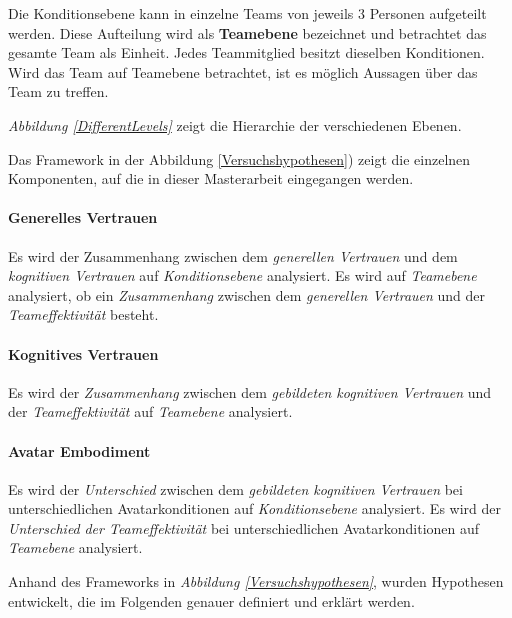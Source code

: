 \documentclass[a4paper,11pt]{article}%
\renewcommand{\\}{\vspace*{0.5\baselineskip} \newline}
\begin{document}
Die Konditionsebene kann in einzelne Teams von jeweils 3 Personen aufgeteilt werden. Diese Aufteilung wird als \textbf{Teamebene} bezeichnet und betrachtet das gesamte Team als Einheit. Jedes Teammitglied besitzt dieselben Konditionen. Wird das Team auf Teamebene betrachtet, ist es möglich Aussagen über das Team zu treffen. 

\textit{Abbildung \ref{DifferentLevels}} zeigt die Hierarchie der verschiedenen Ebenen.

Das Framework in der Abbildung \ref{Versuchshypothesen}) zeigt die einzelnen Komponenten, auf die in dieser Masterarbeit eingegangen werden. 

\paragraph{Generelles Vertrauen}
Es wird der Zusammenhang zwischen dem \textit{generellen Vertrauen} und dem \textit{kognitiven Vertrauen} auf \textit{Konditionsebene} analysiert.
Es wird auf \textit{Teamebene} analysiert, ob ein \textit{Zusammenhang} zwischen dem \textit{generellen Vertrauen} und der \textit{Teameffektivität} besteht.

\paragraph{Kognitives Vertrauen}
Es wird der \textit{Zusammenhang} zwischen dem \textit{gebildeten kognitiven Vertrauen} und der \textit{Teameffektivität} auf \textit{Teamebene} analysiert.

\paragraph{Avatar Embodiment}
Es wird der \textit{Unterschied} zwischen dem \textit{gebildeten kognitiven Vertrauen} bei unterschiedlichen Avatarkonditionen auf \textit{Konditionsebene} analysiert.
Es wird der \textit{Unterschied} \textit{der Teameffektivität} bei unterschiedlichen Avatarkonditionen auf \textit{Teamebene} analysiert.

Anhand des Frameworks in \textit{Abbildung \ref{Versuchshypothesen}}, wurden Hypothesen entwickelt, die im Folgenden genauer definiert und erklärt werden.
\end{document}
